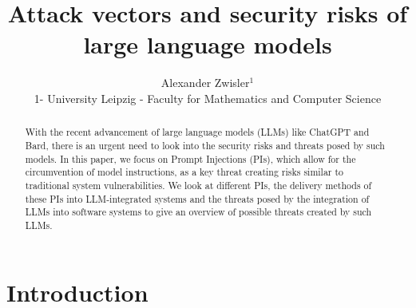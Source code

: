 \documentclass{SeminarV2}
\begin{document}
\title{Attack vectors and security risks of large language models}

\author{Alexander Zwisler$^1$
  \vspace{.3cm}\\
  1- University Leipzig - Faculty for Mathematics and Computer Science \\
}

\maketitle

\begin{abstract}
    With the recent advancement of large language models (LLMs) like ChatGPT and Bard, there is an urgent need to look into the security risks and threats posed by such models. In this paper, we focus on Prompt Injections (PIs), which allow for the circumvention of model instructions, as a key threat creating risks similar to traditional system vulnerabilities. We look at different PIs, the delivery methods of these PIs into LLM-integrated systems and the threats posed by the integration of LLMs into software systems to give an overview of possible threats created by such LLMs.
  
\end{abstract}

\section{Introduction}
\end{document}
